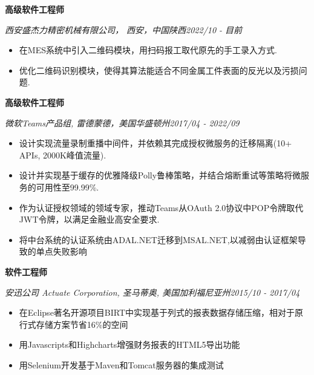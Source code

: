 \documentclass[3pt]{article}
\newenvironment{changemargin}[2]{%
  \begin{list}{}{%
    \setlength{\topsep}{0pt}%
    \setlength{\leftmargin}{#1}%
    \setlength{\rightmargin}{#2}%
    \setlength{\listparindent}{\parindent}%
    \setlength{\itemindent}{\parindent}%
    \setlength{\parsep}{\parskip}%
  }%
  \item[]}{\end{list}
}
\newenvironment{body} {
	\vspace*{-16pt}
	\begin{changemargin}{-0.25in}{-0.5in}
  }	
	{\end{changemargin}
}
\begin{document}
\begin{CJK}{UTF8}{gbsn}
\begin{body}
	\vspace{17pt}
   \textbf{高级软件工程师} \\
   \vspace{1pt}

    \emph{西安盛杰力精密机械有限公司， 西安，中国陕西}\hfill \emph{2022/10 - 目前}\\
     \begin{itemize} \itemsep -0.5pt
	\item {在MES系统中引入二维码模块，用扫码报工取代原先的手工录入方式.}
	\item {优化二维码识别模块，使得其算法能适合不同金属工件表面的反光以及污损问题.}
     \end{itemize}
	
   \textbf{高级软件工程师} \\
   \vspace{1pt}

    \emph{微软Teams产品组, 雷德蒙德，美国华盛顿州}\hfill \emph{2017/04 - 2022/09}\\
     \begin{itemize} \itemsep -0.5pt
	\item {设计实现流量录制重播中间件，并依赖其完成授权微服务的迁移隔离(10+ APIs, 2000K峰值流量).}
	\item {设计并实现基于缓存的优雅降级Polly鲁棒策略，并结合熔断重试等策略将微服务的可用性至99.99\%.}
	\item {作为认证授权领域的领域专家，推动Teams从OAuth 2.0协议中POP令牌取代JWT令牌，以满足金融业高安全要求.}
	\item {将中台系统的认证系统由ADAL.NET迁移到MSAL.NET,以减弱由认证框架导致的单点失败影响}
     \end{itemize}

    \textbf{软件工程师} \\
   \vspace{1pt}

    \emph{安迅公司 Actuate Corporation, 圣马蒂奥, 美国加利福尼亚州}\hfill \emph{2015/10 - 2017/04}\\
     \begin{itemize} \itemsep -0.5pt
	\item {在Eclipse著名开源项目BIRT中实现基于列式的报表数据存储压缩，相对于原行式存储方案节省16\%的空间}
     \item {用Javascripts和Highcharts增强财务报表的HTML5导出功能}
	\item {用Selenium开发基于Maven和Tomcat服务器的集成测试} 
       \end{itemize}
	

\end{body}
\end{CJK}
\end{document}

